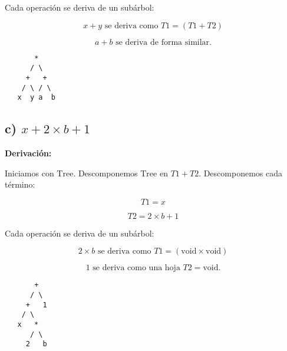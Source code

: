 Cada operación se deriva de un subárbol:

\[
x + y \text{ se deriva como } T1 = (T1 + T2)
\]

\[
a + b \text{ se deriva de forma similar.}
\]
\vspace*{\fill}
\begin{center}
\begin{minipage}{0.2\linewidth}
\centering
\begin{verbatim}
       *
      / \
     +   +
    / \ / \
   x  y a  b

\end{verbatim}
\end{minipage}
\end{center}
\vspace*{\fill}
\subsection*{c) \(x + 2 \times b + 1\)}

\textbf{Derivación:}

Iniciamos con \( \text{Tree} \). Descomponemos \( \text{Tree} \) en \( T1 + T2 \). Descomponemos cada término:

\[
T1 = x
\]

\[
T2 = 2 \times b + 1
\]

Cada operación se deriva de un subárbol:

\[
2 \times b \text{ se deriva como } T1 = ( \text{void} \times \text{void} )
\]

\[
1 \text{ se deriva como una hoja } T2 = \text{void}.
\]

\vspace*{\fill}
\begin{center}
\begin{minipage}{0.2\linewidth}
\centering
\begin{verbatim}
       +
      / \
     +   1
    / \
   x   *
      / \
     2   b
\end{verbatim}
\end{minipage}
\end{center}
\vspace*{\fill}

